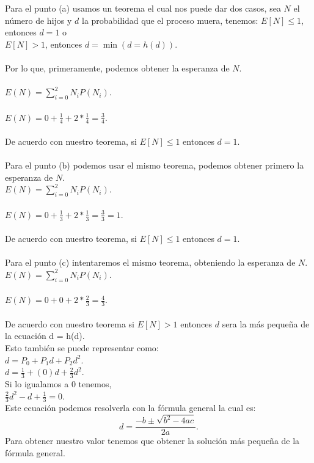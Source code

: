 \documentclass[]{article}
\begin{document}
Para el punto (a) usamos un teorema el cual nos puede dar dos casos, sea $N$ el número de hijos y $d$ la probabilidad que el proceso muera, tenemos:
$E[N] \leq 1$, entonces $d = 1$ o\\
$E[N] > 1 $, entonces $d = \min(d = h(d))$.\\
\\
Por lo que, primeramente, podemos obtener la esperanza de $N$.\\
\\
$E(N) = \sum_{i = 0}^{2}N_{i} P(N_{i})$.\\
\\
$E(N) = 0 + \frac{1}{4} + 2 * \frac{1}{4} = \frac{3}{4} $.\\
\\
De acuerdo con nuestro teorema, si $E[N] \leq 1$ entonces $d = 1$.\\
\\
Para el punto (b) podemos usar el mismo teorema,
podemos obtener primero la esperanza de $N$.
\\
$E(N) = \sum_{i = 0}^{2}N_{i} P(N_{i})$.\\
\\
$E(N) = 0 + \frac{1}{3} + 2 * \frac{1}{3} = \frac{3}{3} = 1 $.\\
\\
De acuerdo con nuestro teorema, si $E[N] \leq 1$ entonces $d = 1$.\\
\\
Para el punto (c) intentaremos el mismo teorema,
obteniendo la esperanza de $N$.
\\
$E(N) = \sum_{i = 0}^{2}N_{i} P(N_{i})$.\\
\\
$E(N) = 0 + 0 + 2 * \frac{2}{3} = \frac{4}{3} $.\\
\\
De acuerdo con nuestro teorema si $E[N] > 1$  entonces $d$ sera la  más pequeña de la ecuación d = h(d).\\
Esto también se puede representar como:\\
$d = P_{0} + P_{1}d + P_{2}d^{2} $.\\
$d = \frac{1}{3} + (0)d + \frac{2}{3}d^{2} $.\\
Si lo igualamos a 0 tenemos,\\
$\frac{2}{3}d^{2} - d + \frac{1}{3} = 0 $.\\
Este ecuación podemos resolverla con la fórmula general la cual es:\\
\[ d = \frac{-b \pm \sqrt{b^{2} - 4ac}}{2a}. \]
Para obtener nuestro valor tenemos que obtener la solución más pequeña de la fórmula general.\\
\end{document}
